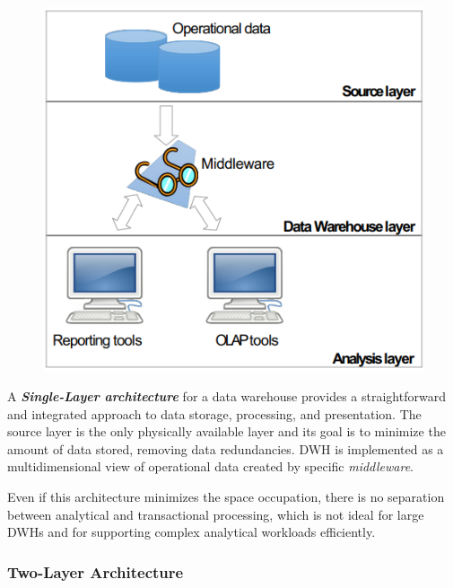 \begin{figure}
    \centering
    \includegraphics[scale=0.6]{images/DWH_single_layer.png}
\end{figure}

A \textit{\textbf{Single-Layer architecture}} for a data warehouse provides a straightforward and integrated approach to data storage, processing, and presentation. The source layer is the only physically available layer and its goal is to minimize the amount of data stored, removing data redundancies. DWH is implemented as a multidimensional view of operational data created by specific \textit{middleware}.

Even if this architecture minimizes the space occupation, there is no separation between analytical and transactional processing, which is not ideal for large DWHs and for supporting complex analytical workloads efficiently.

\subsubsection{Two-Layer Architecture}

